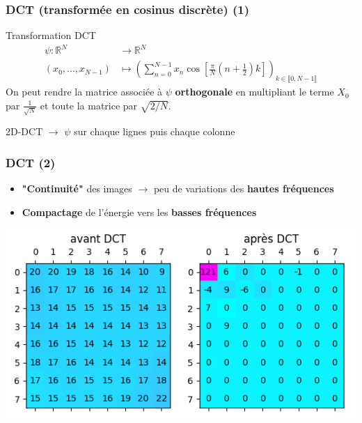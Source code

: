 \documentclass{beamer}
\begin{document}
\begin{frame}
    \frametitle{DCT (transformée en cosinus discrète) (1)}
    \centering
    \begin{block}{Transformation DCT}
        \begin{align*}
            \psi \colon \mathbb{R}^N & \rightarrow \mathbb{R}^N\\
            (x_0, \dots, x_{N-1}) & \longmapsto
            \left( \sum_{n=0}^{N - 1} x_n \cos \left[ \frac{\pi}{N}(n + \frac{1}{2})k \right] \right)_{k \in \llbracket 0, N - 1 \rrbracket}
        \end{align*}
        On peut rendre la matrice associée à $\psi$ \textbf{orthogonale} en multipliant le terme $X_0$ par $\frac{1}{\sqrt{N}}$ et toute la matrice par $\sqrt{2/N}$.
    \end{block}
    2D-DCT $\rightarrow$ $\psi$ sur chaque lignes puis chaque colonne
\end{frame}

\begin{frame}
    \frametitle{DCT (2)}

    \begin{itemize}
        \item \textbf{"Continuité"} des images $\rightarrow$ peu de variations des \textbf{hautes fréquences}
        \item \textbf{Compactage} de l'énergie vers les \textbf{basses fréquences}
    \end{itemize}

    \centering
    \includegraphics[width=\textwidth]{img/energyCompaction.png}

\end{frame}
\end{document}

